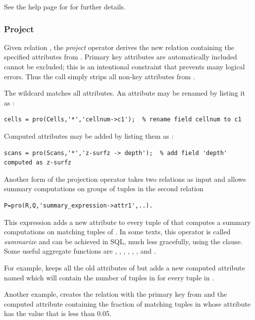\documentclass[10pt]{article}
\begin{document}
See the help page for  for further details.

\subsubsection{Project}\label{sec:pro}
Given relation , the {\em project} operator  derives the new relation  containing the specified attributes from .  Primary key attributes are automatically included cannot be excluded; this is an intentional constraint that prevents many logical errors. Thus the call  simply strips all non-key attributes from .

The wildcard  matches all attributes. An attribute may be renamed by listing it as :
\begin{lstlisting}
cells = pro(Cells,'*','cellnum->c1');  % rename field cellnum to c1
\end{lstlisting}

Computed attributes may be added by listing them as :

\begin{lstlisting}
scans = pro(Scans,'*','z-surfz -> depth');  % add field 'depth' computed as z-surfz
\end{lstlisting}

Another form of the projection operator takes two relations as input and allows summary computations on groups of tuples in the second relation
\begin{lstlisting}  
P=pro(R,Q,'summary_expression->attr1',..). 
\end{lstlisting}
This expression adds a new attribute  to every tuple of  that computes a summary computations on matching tuples of . In some texts, this operator is called {\em summarize} and can be achieved in SQL, much less gracefully, using the  clause.
Some useful aggregate functions are , , , , , , and .

For example,  keeps all the old attributes of  but adds a new computed attribute named  which will contain the number of tuples in  for every tuple in .  

Another example,  creates the relation  with the primary key from  and the computed attribute  containing the fraction of matching tuples in  whose attribute  has the value that is less than 0.05.
\end{document}
